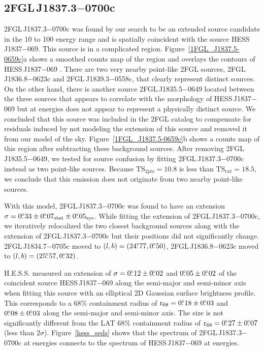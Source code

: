 \documentclass[12pt,preprint]{aastex}
\newcommand{\gev}{\text{GeV}\xspace}
\newcommand{\tev}{\text{TeV}\xspace}
\newcommand{\tsext}{{\ensuremath{\text{TS}_{\text{ext}}}}\xspace}
\newcommand{\tsinc}{\ensuremath{\text{TS}_{\text{2pts}}}\xspace}
\newcommand{\rsixeight}{{\ensuremath{\text{r}_{68}}}\xspace}
\newcommand{\sys}{\text{sys}\xspace}
\newcommand{\stat}{\text{stat}\xspace}
\begin{document}
\subsection{2FGL\,J1837.3$-$0700c}
\label{section_2FGL_J1837.3-0700c}



2FGL\,J1837.3$-$0700c was found by our search to be an extended source
candidate in the 10 \gev to 100 \gev energy range and is spatially
coincident with the \tev source HESS\,J1837$-$069.  This source is
in a complicated region.  Figure~\ref{1FGL_J1837.5-0659c}a shows a
smoothed counts map of the region and overlays the \tev contours of
HESS\,J1837$-$069 \citep{hess_plane_survey}.  There are two very nearby
point-like 2FGL sources, 2FGL\,J1836.8$-$0623c and 2FGL\,J1839.3$-$0558c,
that clearly represent distinct sources.  On the other hand, there is
another source 2FGL\,J1835.5$-$0649 located between the three sources that
appears to correlate with the \tev morphology of HESS\,J1837$-$069 but
at \gev energies
does not appear to represent a physically distinct source.  We concluded
that this source was included in the 2FGL catalog to compensate for residuals induced by
not modeling the extension of this source and removed it from our model
of the sky.  Figure~\ref{1FGL_J1837.5-0659c}b shows a
counts map of this region after subtracting these background sources.
After removing 2FGL\,J1835.5$-$0649,
we tested for
source confusion by fitting 
2FGL\,J1837.3$-$0700c
instead as two point-like sources.
Because $\tsinc=10.8$ is less than $\tsext=18.5$, we conclude that this emission
does not originate from two nearby point-like sources.

With this model, 2FGL\,J1837.3$-$0700c was found to have an
extension $\sigma=0\fdg33\pm0\fdg07_\stat\pm0\fdg05_\sys$.
While fitting the extension of 2FGL\,J1837.3$-$0700c,
we iteratively relocalized the two closest
background sources along with the extension of 2FGL\,J1837.3$-$0700c but
their positions did not significantly change.  2FGL\,J1834.7$-$0705c
moved to $(l,b)=(24\mbox{$.\!\!^\circ$}77,0\mbox{$.\!\!^\circ$}50)$, 2FGL\,J1836.8$-$0623c moved
to $(l,b)=(25\mbox{$.\!\!^\circ$}57,0\mbox{$.\!\!^\circ$}32)$. 

H.E.S.S. measured an extension of
$\sigma=0\mbox{$.\!\!^\circ$}12\pm0\mbox{$.\!\!^\circ$}02$ and $0\mbox{$.\!\!^\circ$}05\pm0\mbox{$.\!\!^\circ$}02$ 
of the coincident \tev source HESS\,J1837$-$069 
along the semi-major and semi-minor axis when fitting this source
with an elliptical 2D Gaussian surface brightness profile.  This corresponds
to a 68\% containment radius of $\rsixeight=0\fdg18\pm0\fdg03$ and
$0\mbox{$.\!\!^\circ$}08\pm0\mbox{$.\!\!^\circ$}03$ along the semi-major and semi-minor axis. The
size is not significantly different from the LAT 68\% containment
radius of $\rsixeight=0\fdg27\pm0\fdg07$ (less than $2\sigma$).
Figure~\ref{hess_seds} shows that the spectrum of 2FGL\,J1837.3$-$0700c
at \gev energies connects to the spectrum of HESS\,J1837$-$069 at \tev
energies.
\end{document}
